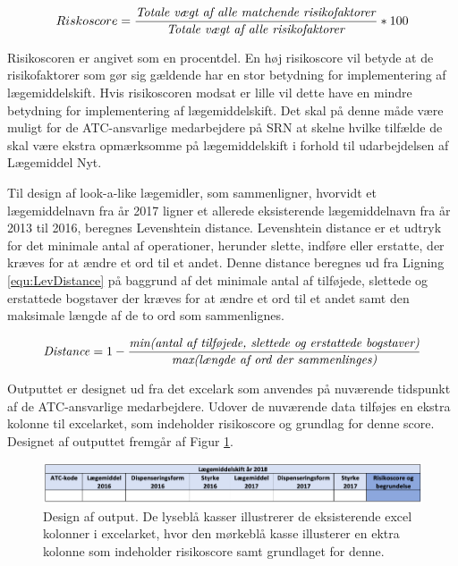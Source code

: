 \begin{equation}  \label{equ:risikoscore}
Riskoscore = \frac{\mbox{\textit{Totale vægt af alle matchende risikofaktorer}}}{\mbox{\textit{Totale vægt af alle risikofaktorer}}} * 100
\end{equation}

Risikoscoren er angivet som en procentdel. En  høj risikoscore vil betyde at de risikofaktorer som gør sig gældende har en stor betydning for implementering af lægemiddelskift. Hvis risikoscoren modsat er lille vil dette have en mindre betydning for implementering af lægemiddelskift. Det skal på denne måde være muligt for de ATC-ansvarlige medarbejdere på SRN at skelne hvilke tilfælde de skal være ekstra opmærksomme på lægemiddelskift i forhold til udarbejdelsen af Lægemiddel Nyt.  

Til design af look-a-like lægemidler, som sammenligner, hvorvidt et lægemiddelnavn fra år 2017 ligner et allerede eksisterende lægemiddelnavn fra år 2013 til 2016, beregnes Levenshtein distance. Levenshtein distance er et udtryk for det minimale antal af operationer, herunder slette, indføre eller erstatte, der kræves for at ændre et ord til et andet. Denne distance beregnes ud fra Ligning \ref{equ:LevDistance} på baggrund af det minimale antal af tilføjede, slettede og erstattede bogstaver der kræves for at ændre et ord til et andet samt den maksimale længde af de to ord som sammenlignes. 

\begin{equation} \label{equ:LevDistance}
\mbox{\textit{Distance}} = 1 - \frac{\mbox{\textit{min(antal af tilføjede, slettede og erstattede bogstaver)}}}{\mbox{\textit{max(længde af ord der sammenlinges)}}}   
\end{equation}


Outputtet er designet ud fra det excelark som anvendes på nuværende tidspunkt af de ATC-ansvarlige medarbejdere. Udover de nuværende data tilføjes en ekstra kolonne til excelarket, som indeholder risikoscore og grundlag for denne score. Designet af outputtet fremgår af Figur \ref{fig:Output}.

\begin{figure}[H]\centering
\includegraphics[width=1\textwidth]{billeder/Output.png} 
	\caption{Design af output. De lyseblå kasser illustrerer de eksisterende excel kolonner i excelarket, hvor den mørkeblå kasse illusterer en ektra kolonne som indeholder risikoscore samt grundlaget for denne.}
	\label{fig:Output}  
\end{figure}

